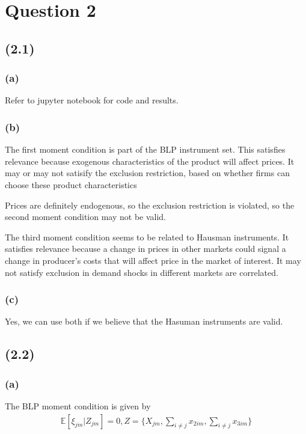 \documentclass[11pt]{article}
\newcommand{\EE}{\mathbb{E}}
\begin{document}
\section*{Question 2}

\subsection*{(2.1)}

\subsubsection*{(a)}
Refer to jupyter notebook for code and results. 

\subsubsection*{(b)}
The first moment condition is part of the BLP instrument set. 
This satisfies relevance because exogenous characteristics of the product will affect prices.
It may or may not satisify the exclusion restriction, based on whether firms can choose these product characteristics

Prices are definitely endogenous, so the exclusion restriction is violated, so the second moment condition may not be valid.

The third moment condition seems to be related to Hausman instruments. 
It satisfies relevance because a change in prices in other markets could signal a change in producer's costs that will affect price in the market of interest.
It may not satisfy exclusion in demand shocks in different markets are correlated.

\subsubsection*{(c)}
Yes, we can use both if we believe that the Hasuman instruments are valid.

\subsection*{(2.2)}

\subsubsection*{(a)}
The BLP moment condition is given by
\begin{align*}
    \EE[\xi_{jm} | Z_{jm}] = 0, Z = \{ X_{jm}, \sum_{i \neq j} x_{2im}, \sum_{i \neq j} x_{3im} \}
\end{align*}
\end{document}
